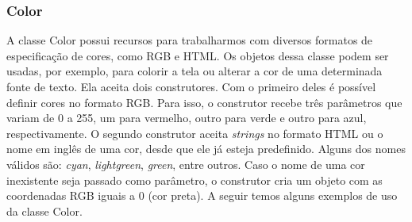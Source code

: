 \subsubsection{Color}
%
%
A classe Color possui recursos para trabalharmos com diversos formatos de especificação de cores, como RGB e HTML. Os objetos dessa classe podem ser usadas, por exemplo, para colorir a tela ou alterar a cor de uma determinada fonte de texto. Ela aceita dois construtores. Com o primeiro deles é possível definir cores no formato RGB. Para isso, o construtor recebe três parâmetros que variam de 0 a 255, um para vermelho, outro para verde e outro para azul, respectivamente. O segundo construtor aceita \textit{strings} no formato HTML ou o nome em inglês de uma cor, desde que ele já esteja predefinido. Alguns dos nomes válidos são: \textit{cyan}, \textit{lightgreen}, \textit{green}, entre outros. Caso o nome de uma cor inexistente seja passado como parâmetro, o construtor cria um objeto com as coordenadas RGB iguais a 0 (cor preta). A seguir temos alguns exemplos de uso da classe Color.
%
%

%
%
